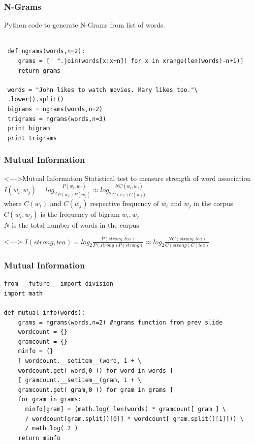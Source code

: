 \documentclass[serif,11pt,aspectratio=1610,table]{beamer}
\begin{document}
\begin{frame}[fragile]
 \frametitle{N-Grams}
 Python code to generate N-Grams from list of words.
 \footnotesize
 \begin{Verbatim}

 def ngrams(words,n=2):
    grams = [" ".join(words[x:x+n]) for x in xrange(len(words)-n+1)]
    return grams

 words = "John likes to watch movies. Mary likes too."\
 .lower().split()
 bigrams = ngrams(words,n=2)
 trigrams = ngrams(words,n=3)
 print bigram
 print trigrams
 \end{Verbatim}

\end{frame}


\begin{frame}[fragile]
 \frametitle{Mutual Information}
\begin{block}<+->{Mutual Information}
 Statistical test to measure strength of word association \\
 $ I(w_{i},w_{j}) = log_{2}\frac{P(w_{i},w_{j})}{P(w_{i})P(w_{j})} \approx log_{2} \frac{NC(w_{i},w_{j})}{C(w_{i}) C(w_{j})} $ \\
 where $C(w_{i})$ and $C(w_{j})$ respective frequency of $w_{i}$ and $w_{j}$ in the corpus \\
 $C(w_{i},w_{j})$ is the frequency of bigram $w_{i},w_{j}$ \\
 $N$ is the total number of words in the corpus
\end{block}

\begin{block}<+->{}
 $ I(strong,tea) = log_{2}\frac{P(strong,tea)}{P(strong)P(strong)} \approx log_{2} \frac{NC(strong,tea)}{C(strong) C(tea)} $
\end{block}


\end{frame}


\begin{frame}[fragile]
 \frametitle{Mutual Information}
 \footnotesize
 \begin{verbatim}
from __future__ import division
import math

def mutual_info(words):
    grams = ngrams(words,n=2) #ngrams function from prev slide
    wordcount = {}
    gramcount = {}
    minfo = {}
    [ wordcount.__setitem__(word, 1 + \
    wordcount.get( word,0 )) for word in words ]
    [ gramcount.__setitem__(gram, 1 + \
    gramcount.get( gram,0 )) for gram in grams ]
    for gram in grams:
      minfo[gram] = (math.log( len(words) * gramcount[ gram ] \
      / wordcount[gram.split()[0]] * wordcount[ gram.split()[1]])) \
      / math.log( 2 )
    return minfo
\end{verbatim}
\end{frame}
\end{document}
